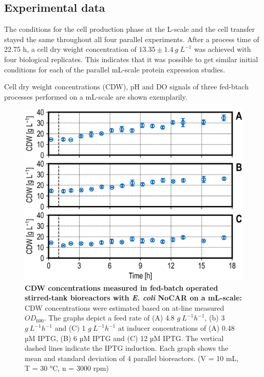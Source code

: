 \documentclass[sn-standardnature]{sn-jnl}%
\theoremstyle{thmstyleone}%
\theoremstyle{thmstyletwo}%
\theoremstyle{thmstylethree}%
\begin{document}
\subsection{Experimental data}
The conditions for the cell production phase at the L-scale and the cell transfer stayed the same throughout all four parallel experiments.
After a process time of 22.75 h, a cell dry weight concentration of $13.35 \pm 1.4\ g\ L^{-1}$ was achieved with four biological replicates.
This indicates that it was possible to get similar initial conditions for each of the parallel mL-scale protein expression studies.

Cell dry weight concentrations (CDW), pH and DO signals of three fed-btach processes performed on a mL-scale are shown exemplarily.

\begin{figure}[h]
    \centering
    \includegraphics[width=1.0\textwidth]{figures/btm_overview.png}
    \caption{
        \textbf{CDW concentrations measured in fed-batch operated stirred-tank bioreactors with \textit{E. coli} NoCAR on a mL-scale:}
        CDW concentrations were estimated based on at-line measured $OD_{600}$.
        The graphs depict a feed rate of (A) 4.8 $ g\ L^{-1} h^{-1}$, (b) 3 $ g\ L^{-1} h^{-1}$ and (C) 1 $ g\ L^{-1} h^{-1}$ at inducer concentrations of (A) 0.48 µM IPTG, (B) 6 µM IPTG and (C) 12 µM IPTG.
        The vertical dashed lines indicate the IPTG induction.
        Each graph shows the mean and standard deviation of 4 parallel bioreactors.
        (V = 10 mL, T = 30 °C, n = 3000 rpm)
    }
    \label{fig_btmoverview}
\end{figure}
\end{document}
